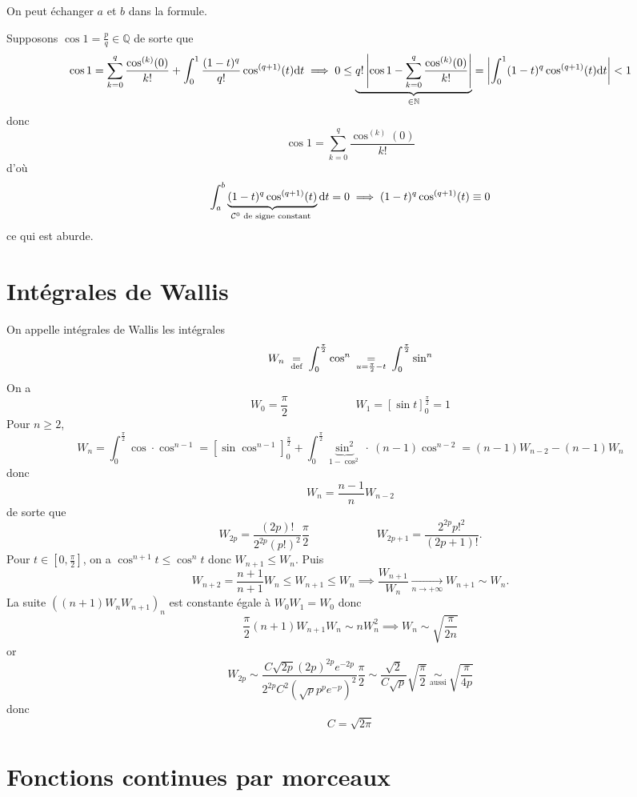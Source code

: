 \begin{rem}
    On peut échanger $a$ et $b$ dans la formule.
\end{rem}

\begin{ex}
    Supposons $\cos 1=\frac pq\in\mathbb Q$ de sorte que \[
        \cos 1=\sum_{k=0}^q\frac{\cos^{(k)}(0)}{k!}+\int_0^1\frac{(1-t)^q}{q!}\cos^{(q+1)}(t)\mathrm{d} t\implies0\leq \underbrace{q! \left| \cos 1-\sum_{k=0}^q\frac{\cos^{(k)}(0)}{k!} \right|}_{\in\mathbb N}= \left| \int_0^1(1-t)^q\cos^{(q+1)}(t)\mathrm{d} t \right|<1
    \]
    donc \[
        \cos 1=\sum_{k=0}^q\frac{\cos^{(k)}(0)}{k!}
    \]
    d'où \[
        \int_a^b\underbrace{(1-t)^q\cos^{(q+1)}(t)}_{\mathcal C^0\text{ de signe constant }}\mathrm{d} t=0\implies (1-t)^q\cos^{(q+1)}(t)\equiv 0
    \]
    ce qui est aburde.
\end{ex}

\section{Intégrales de Wallis}

On appelle intégrales de Wallis les intégrales \[
    W_n\;\underset{\text{def}}=\;\int_0^{\frac\pi2}\cos^n\underset{\;u=\frac\pi2-t\;}=\int_0^{\frac\pi2}\sin^n
\]
On a \[
    W_0=\frac\pi2\qquad \qquad \qquad W_1=[\sin t]_0^{\frac\pi2}=1
\]
Pour $n\geq 2$, \[
    W_n=\int_0^{\frac\pi2}\cos \cdot \cos^{n-1}=[\sin\cos^{n-1}]_0^{\frac\pi2}+\int_0^{\frac\pi2}\underbrace{\sin^2}_{1-\cos^2}\cdot~(n-1)\cos^{n-2}=(n-1)W_{n-2}-(n-1)W_n
\]
donc \[
W_n=\frac{n-1}nW_{n-2}
\]
de sorte que \[
    W_{2p}=\frac{(2p)!}{2^{2p}(p!)^2}\frac\pi2\qquad\qquad\qquad W_{2p+1}=\frac{2^{2p}p!^2}{(2p+1)!}.
\]
Pour $t\in [0, \frac\pi2]$, on a $\cos^{n+1}t\leq \cos^nt$ donc $W_{n+1}\leq W_n$. Puis \[
    W_{n+2}=\frac{n+1}{n+1}W_n\leq W_{n+1}\leq W_n \implies \frac{W_{n+1}}{W_n}\xrightarrow[n\to+\infty]{}W_{n+1}\sim W_n.
\]
La suite $((n+1)W_nW_{n+1})_n$ est constante égale à $W_0W_1=W_0$ donc \[
    \frac\pi2(n+1)W_{n+1}W_n\sim nW_n^2\implies W_n\sim\sqrt{\frac{\pi}{2n}}
\]
or \[
    W_{2p}\sim\frac{C\sqrt{2p}(2p)^{2p}e^{-2p}}{2^{2p}C^2(\sqrt pp^pe^{-p})^2}\frac\pi2\sim \frac{\sqrt2}{C\sqrt p}\sqrt{\frac\pi2}\underset{\text{ aussi }}\sim\sqrt{\frac{\pi}{4p}}
\]
donc \[
    C=\sqrt {2\pi}
\]

\section{Fonctions continues par morceaux}

